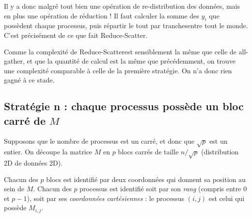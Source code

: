 Il y a donc malgré tout bien une opération de re-distribution des données, mais
en plus une opération de réduction ! Il faut calculer la somme des $y_i$ que
possèdent chaque processus, puis répartir le tout par \og tranches\fg entre tout
le monde. C'est précisément de ce que fait \og Reduce-Scatter\fg.

Comme la complexité de \og Reduce-Scatter\fg est sensiblement la même que celle
de \og all-gather\fg, et que la quantité de calcul est la même que précédemment,
on trouve une complexité comparable à celle de la première stratégie. On n'a
donc rien gagné à ce stade.

\subsection{Stratégie n : chaque processus possède un
  bloc carré de $M$}

Supposons que le nombre de processus est un carré, et donc que $\sqrt{p}$ est un
entier. On découpe la matrice $M$ en $p$ blocs carrés de taille $n / \sqrt{p}$
(distribution 2D de données 2D).

Chacun des $p$ blocs est identifié par deux coordonnées qui donnent sa
position au sein de $M$. Chacun des $p$ processus est identifié soit
par son \emph{rang} (compris entre $0$ et $p-1$), soit par ses
\emph{coordonnées cartésiennes} : le processus $(i,j)$ est celui qui
possède $M_{i,j}$.


\begin{center}
\end{center}

